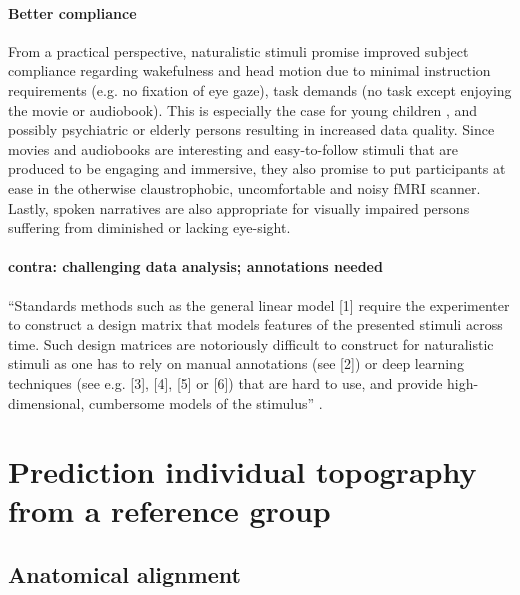 \paragraph{Better compliance}
%
From a practical perspective, naturalistic stimuli promise improved subject
compliance regarding wakefulness and head motion due to minimal instruction
requirements (e.g. no fixation of eye gaze), task demands (no task except
enjoying the movie or audiobook).
%
This is especially the case for young children \citep{vanderwal2015inscapes},
and possibly psychiatric \citep{eickhoff2020towards} or elderly persons
resulting in increased data quality.
%
Since movies and audiobooks are interesting and easy-to-follow stimuli that are
produced to be engaging and immersive, they also promise to put participants at
ease in the otherwise claustrophobic, uncomfortable and noisy fMRI scanner.
%
Lastly, spoken narratives are also appropriate for visually impaired persons
suffering from diminished or lacking eye-sight.


\paragraph{contra: challenging data analysis; annotations needed}


``Standards methods such as the general linear model [1] require the
experimenter to construct a design matrix that models features of the presented
stimuli across time. Such design matrices are notoriously difficult to construct
for naturalistic stimuli as one has to rely on manual annotations (see [2]) or
deep learning techniques (see e.g. [3], [4], [5] or [6]) that are hard to use,
and provide high-dimensional, cumbersome models of the stimulus''
\citep{richard2019fast}.


\section{Prediction individual topography from a reference group}




\subsection{Anatomical alignment}

